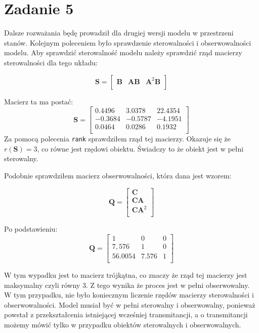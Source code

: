 \documentclass[a4paper,titlepage,11pt,floatssmall]{mwrep}
\begin{document}
\newpage
\section{Zadanie 5}
\indent{} Dalsze rozważania będę prowadził dla drugiej wersji modelu w przestrzeni stanów.
\indent{} Kolejnym poleceniem było sprawdzenie sterowalności i obserwowalności modelu. Aby sprawdzić sterowalność modelu należy sprawdzić rząd macierzy sterowalności dla tego układu:

$$
\mathbf{S} =
\left[ \begin{array}{ccc}
\mathbf{B} & \mathbf{A}\mathbf{B} & \mathbf{A}^{2}\mathbf{B}\\
\end{array} \right]
$$

Macierz ta ma postać:
$$
\mathbf{S} =
\left[ \begin{array}{ccc}
0.4496 & 3.0378 & 22.4354 \\
-0.3684 & -0.5787 & -4.1951  \\
0.0464 & 0.0286  & 0.1932 \\
\end{array} \right]
$$
Za pomocą polecenia \texttt{rank} sprawdziłem rząd tej macierzy. Okazuje się że $r(\mathbf{S}) = 3$, co równe jest rzędowi obiektu. Świadczy to że obiekt jest w pełni sterowalny.

Podobnie sprawdziłem macierz obserwowalności, która dana jest wzorem:

$$
\mathbf{Q} =
\left[ \begin{array}{c}
\mathbf{C} \\
\mathbf{C}\mathbf{A} \\
\mathbf{C}\mathbf{A}^{2}\\
\end{array} \right]
$$

Po podstawieniu:
$$
\mathbf{Q} =
\left[ \begin{array}{ccc}
1 & 0 & 0 \\
7,576 & 1 & 0  \\
56.0054 & 7.576  & 1 \\
\end{array} \right]
$$

W tym wypadku jest to macierz trójkątna, co znaczy że rząd tej macierzy jest maksymalny czyli równy 3. Z tego wynika że proces jest w pełni obserwowalny. \\

W tym przypadku, nie było koniecznym liczenie rzędów macierzy sterowalności i obserwowalności. Model musiał być w pełni sterowalny i obserwowalny, ponieważ powstał z przekształcenia istniejącej wcześniej transmitancji, a o transmitancji możemy mówić tylko w przypadku obiektów sterowalnych i obserwowalnych. 
\end{document}
